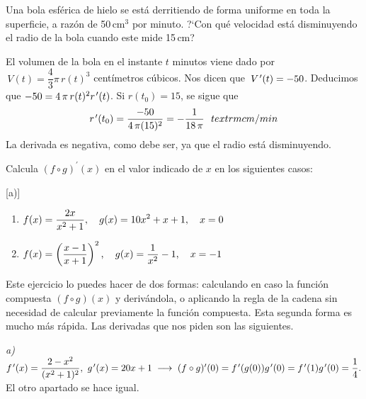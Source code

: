 \begin{ejercicios resueltos}
\resuelto Una bola esférica de hielo se está derritiendo de forma
uniforme en toda la superficie, a razón de 50\,cm$^{3}$ por minuto.
?`Con qué velocidad está disminuyendo el radio de la bola cuando este
mide 15\,cm?

\sol El volumen de la bola en el instante $t$ minutos viene dado
por $\,V(t)=\dfrac{4}{3}\pi\,r(t)^{3}$ centímetros cúbicos. Nos dicen
que $\,V\mbox{$^{\mspace{2mu}\prime}$}(t)=-50$. Deducimos que $-50=4\,\pi\,r(t)^{2}r\mbox{$^{\mspace{2mu}\prime}$}(t)$.
Si $r(t_{0})=15$, se sigue que 
\[
r\tl(t_{0})=\dfrac{-50}{4\,\pi(15)^{2}}=-\dfrac{1}{18\,\pi}\ \ textrm{cm/min}
\]
La derivada es negativa, como debe ser, ya que el radio está disminuyendo.\hecho

\resuelto Calcula $(f\circ g)^{\prime}(x)$ en el valor indicado
de $x$ en los siguientes casos: 

{[}a){]} 
\begin{enumerate}
\item $\displaystyle{f(x)=\frac{2x}{x^{2}+1},\quad g(x)=10x^{2}+x+1,\quad x=0}$ 
\item $\displaystyle{f(x)=\left(\frac{x-1}{x+1}\right)^{2},\quad g(x)=\frac{1}{x^{2}}-1,\quad x=-1}$ 
\end{enumerate}
\sol Este ejercicio lo puedes hacer de dos formas: calculando en
caso la función compuesta $(f\circ g)(x)$ y derivándola, o aplicando
la regla de la cadena sin necesidad de calcular previamente la función
compuesta. Esta segunda forma es mucho más rápida. Las derivadas que
nos piden son las siguientes.

\emph{a)}\ $f\tl(x)=\dfrac{2-x^{2}}{(x^{2}+1)^{2}},\ g\tl(x)=20x+1\;\longrightarrow\;(f\circ g)^{\prime}(0)=f\tl(g(0))g\tl(0)=f\tl(1)g\tl(0)=\dfrac{1}{4}.$
El otro apartado se hace igual.\hecho


\end{ejercicios resueltos}

